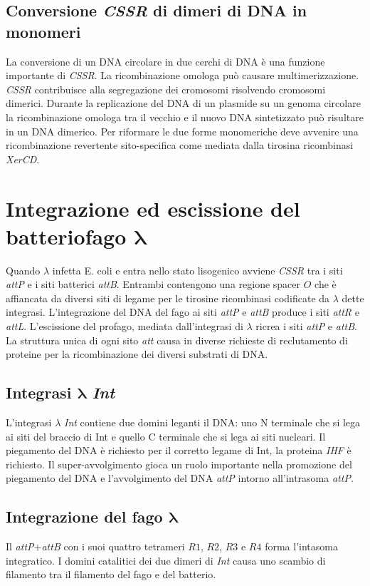 	\subsection{Conversione \emph{CSSR} di dimeri di DNA in monomeri}
	La conversione di un DNA circolare in due cerchi di DNA \`e una funzione importante di \emph{CSSR}.
	La ricombinazione omologa pu\`o causare multimerizzazione.
	\emph{CSSR} contribuisce alla segregazione dei cromosomi risolvendo cromosomi dimerici.
	Durante la replicazione del DNA di un plasmide su un genoma circolare la ricombinazione omologa tra il vecchio e il nuovo DNA sintetizzato pu\`o risultare in un DNA dimerico.
	Per riformare le due forme monomeriche deve avvenire una ricombinazione revertente sito-specifica come mediata dalla tirosina ricombinasi \emph{XerCD}.

\section{Integrazione ed escissione del batteriofago $\mathbf{\lambda}$}
Quando $\lambda$ infetta E. coli e entra nello stato lisogenico avviene \emph{CSSR} tra i siti \emph{attP} e i siti batterici \emph{attB}.
Entrambi contengono una regione spacer $O$ che \`e affiancata da diversi siti di legame per le tirosine ricombinasi codificate da $\lambda$ dette integrasi.
L'integrazione del DNA del fago ai siti \emph{attP} e \emph{attB} produce i siti \emph{attR} e \emph{attL}.
L'escissione del profago, mediata dall'integrasi di $\lambda$ ricrea i siti \emph{attP} e \emph{attB}.
La struttura unica di ogni sito \emph{att} causa in diverse richieste di reclutamento di proteine per la ricombinazione dei diversi substrati di DNA.

	\subsection{Integrasi $\mathbf{\lambda}$ \emph{Int}}
	L'integrasi $\lambda$ \emph{Int} contiene due domini leganti il DNA: uno N terminale che si lega ai siti del braccio di Int e quello C terminale che si lega ai siti nucleari.
	Il piegamento del DNA \`e richiesto per il corretto legame di Int, la proteina \emph{IHF} \`e richiesto.
	Il super-avvolgimento gioca un ruolo importante nella promozione del piegamento del DNA e l'avvolgimento del DNA \emph{attP} intorno all'intrasoma \emph{attP}.

	\subsection{Integrazione del fago $\mathbf{\lambda}$}
	Il \emph{attP}$+$\emph{attB} con i suoi quattro tetrameri $R1$, $R2$, $R3$ e $R4$ forma l'intasoma integratico.
	I domini catalitici dei due dimeri di \emph{Int} causa uno scambio di filamento tra il filamento del fago e del batterio.

